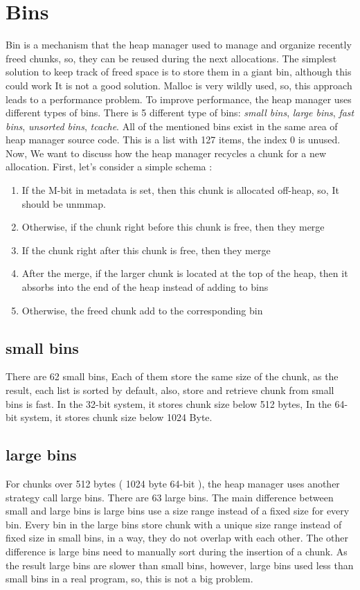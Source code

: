 \documentclass{masterthesis}
\newcommand*\tch{tcache}
\newcommand*\fb{fast bins}
\newcommand*\ub{unsorted bins}
\newcommand*\lb{large bins}
\newcommand*\sbs{small bins}
\begin{document}
\section{Bins}
	Bin is a mechanism that the heap manager used to manage and organize recently freed chunks, so, they can be reused during the next allocations. The simplest solution to keep track of freed space is to store them in a giant bin, although this could work It is not a good solution. Malloc is very wildly used, so, this approach leads to a performance problem.
To improve performance, the heap manager uses different types of bins. There is 5 different type of bins: \emph{\sbs{}}, \emph{\lb{}}, \emph{\fb{}}, \emph{\ub{}}, \emph{\tch{}}. All of the mentioned bins exist in the same area of heap manager source code. This is a list with 127 items, the index 0 is unused. 
Now, We want to discuss how the heap manager recycles a chunk for a new allocation. First, let's consider a simple schema :
\begin{enumerate}
	\item If the M-bit in metadata is set, then this chunk is allocated off-heap, so, It should be unmmap.
	\item Otherwise, if the chunk right before this chunk is free, then they merge
	\item If the chunk right after this chunk is free, then they merge
	\item After the merge, if the larger chunk is located at the top of the heap, then it absorbs into the end of the heap instead of adding to bins
	\item Otherwise, the freed chunk add to the corresponding bin
\end{enumerate}

\subsection{\sbs{}}
There are 62 \sbs{}, Each of them store the same size of the chunk, as the result, each list is sorted by default, also, store and retrieve chunk from \sbs{} is fast. In the 32-bit system, it stores chunk size below 512 bytes, In the 64-bit system, it stores chunk size below 1024 Byte. 

\subsection{\lb{}}
For chunks over 512 bytes ( 1024 byte 64-bit ), the heap manager uses another strategy call \lb{}. There are 63 \lb{}. The main difference between small and \lb{} is \lb{} use a size range instead of a fixed size for every bin. Every bin in the \lb{} store chunk with a unique size range instead of fixed size in \sbs{}, in a way, they do not overlap with each other.
The other difference is \lb{} need to manually sort during the insertion of a chunk. As the result \lb{} are slower than \sbs{}, however, \lb{} used less than \sbs{} in a real program, so, this is not a big problem.
\end{document}
